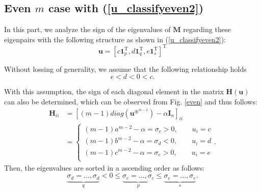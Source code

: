  \subsection{Even   $m$ case with (\ref{u_classifyeven2}) }
In  this part,  we   analyze  the  sign  of  the  eigenvalues   of  $\mathbf M$    regarding  these  eigenpairs
with  the  following  structure
 as shown in 
(\ref{u_classifyeven2}):
\begin{equation}\label{u3struc}
\mathbf u
=[
c \mathbf 1_{p}^{\mathrm T},
d \mathbf 1_{q}^{\mathrm T},
e \mathbf 1_{s}^{\mathrm T}
]^{\mathrm T}
\end{equation}

Without lossing of generality,  we  assume that  the  following  relationship holds
\begin{equation}
e < d<0 <c. 
\end{equation}



With  this  assumption, the  sign  of  each  diagonal  element  in  the  matrix  $  \mathbf H (\mathbf u)$  can also  be  determined,   which  can be  observed  from  Fig. \ref{even}  and  thus follows:
	\begin{align}\label{eigenclss}
\mathbf H _{ii} 
&=   
[ (m-1) diag (\mathbf u ^{\circledast^{m-2}})
-\alpha \mathbf  I_{n}  ] _{ii} 
\nonumber 
\\
&=
\begin{cases}
(m-1) a^{m-2}-\alpha = \sigma_{c} >0  ,  \quad  \quad    u_{i}=c     \\
(m-1) b^{m-2}-\alpha = \sigma_{d}  <0,  \quad  \quad    u_{i}=d      \\
(m-1) c^{m-2}-\alpha = \sigma_{e}  >0,  \quad  \quad    u_{i}=e      \\
\end{cases}.
\end{align}
Then,  the  eigenvalues are  sorted in  a  ascending  order  as   follows:
\begin{equation}\label{Heigenorder} 
\underbrace{
	\sigma_{d} = \dots, \sigma_{d} }_{q}
<0
\le 
\underbrace{
	\sigma_{c} = \dots, \sigma_{c} }_{p}
\le  
\underbrace{
	\sigma_{e} = \dots, \sigma_{e} }_{s} .
\end{equation}


